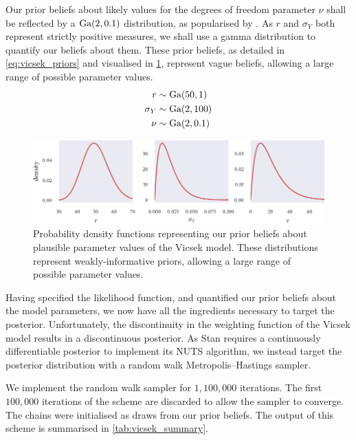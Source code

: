 Our prior beliefs about likely values for the degrees of freedom parameter $\nu$ shall be
reflected by a $\textrm{Ga}(2, 0.1)$ distribution, as popularised by \textcite{juarez10}. As $r$
and $\sigma_Y$ both represent strictly positive measures, we shall use a gamma
distribution to quantify our beliefs about them. These prior beliefs, as detailed in
\cref{eq:vicsek_priors} and visualised in \cref{fig:vicsek_priors}, represent vague
beliefs, allowing a large range of possible parameter values.
\begin{align}
  \label{eq:vicsek_priors}
  \begin{split}
    r           & \sim \textrm{Ga}(50, 1) \\
    \sigma_Y    & \sim \textrm{Ga}(2, 100)\\
    \nu         & \sim \textrm{Ga}(2, 0.1)
  \end{split}
\end{align}
\begin{figure}[tbp]
  \includegraphics{vicsek_priors.pdf}
  \caption{Probability density functions representing our prior beliefs about plausible
    parameter values of the Vicsek model. These distributions represent
    weakly-informative priors, allowing a large range of possible parameter values.}
  \label{fig:vicsek_priors}
\end{figure}

Having specified the likelihood function, and quantified our prior beliefs about the model
parameters, we now have all the ingredients necessary to target the posterior.
Unfortunately, the discontinuity in the weighting function of the Vicsek model results in
a discontinuous posterior. As Stan requires a continuously differentiable posterior to
implement its NUTS algorithm, we instead target the posterior distribution with a random
walk Metropolis--Hastings sampler.

We implement the random walk sampler for $1,100,000$ iterations. The first $100,000$
iterations of the scheme are discarded to allow the sampler to converge.  The chains were
initialised as draws from our prior beliefs. The output of this scheme is summarised in
\cref{tab:vicsek_summary}.

